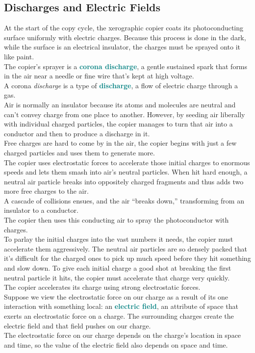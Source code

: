 \documentclass[12pt]{article}
\theoremstyle{definition}
\newcommand{\defnterm}[1]{\textbf{\textcolor{teal}{#1}}\index{#1}}
\begin{document}
\subsection{Discharges and Electric Fields}
At the start of the copy cycle, the xerographic copier coats its photoconducting surface uniformly with electric charges.
Because this process is done in the dark, while the surface is an electrical insulator, the charges must be sprayed onto it like paint. \\
The copier's sprayer is a \defnterm{corona discharge}, a gentle sustained spark that forms in the air near a needle or fine wire that's kept at high voltage. \\

A corona \emph{discharge} is a type of \defnterm{discharge}, a flow of electric charge through a gas. \\
Air is normally an insulator because its atoms and molecules are neutral and can't convey charge from one place to another.
However, by seeding air liberally with individual charged particles, the copier manages to turn that air into a conductor and then to produce a discharge in it. \\

Free charges are hard to come by in the air, the copier begins with just a few charged particles and uses them to generate more. \\
The copier uses electrostatic forces to accelerate those initial charges to enormous speeds and lets them smash into air's neutral particles.
When hit hard enough, a neutral air particle breaks into oppositely charged fragments and thus adds two more free charges to the air. \\
A cascade of collisions ensues, and the air ``breaks down,'' transforming from an insulator to a conductor. \\
The copier then uses this conducting air to spray the photoconductor with charges. \\

To parlay the initial charges into the vast numbers it needs, the copier must accelerate them aggressively.
The neutral air particles are so densely packed that it's difficult for the charged ones to pick up much speed before they hit something and slow down.
To give each initial charge a good shot at breaking the first neutral particle it hits, the copier must accelerate that charge very quickly. \\
The copier accelerates its charge using strong electrostatic forces. \\
Suppose we view the electrostatic force on our charge as a result of its one interaction with something local: an \defnterm{electric field}, an attribute of space that exerts an electrostatic force on a charge.
The surrounding charges create the electric field and that field pushes on our charge. \\
The electrostatic force on our charge depends on the charge's location in space and time, so the value of the electric field also depends on space and time. \\
\end{document}
